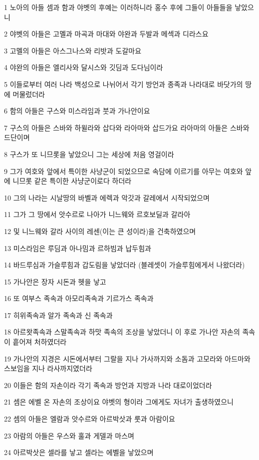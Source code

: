 \par 1 노아의 아들 셈과 함과 야벳의 후예는 이러하니라 홍수 후에 그들이 아들들을 낳았으니
\par 2 야벳의 아들은 고멜과 마곡과 마대와 야완과 두발과 메섹과 디라스요
\par 3 고멜의 아들은 아스그나스와 리밧과 도갈마요
\par 4 야완의 아들은 엘리사와 달시스와 깃딤과 도다님이라
\par 5 이들로부터 여러 나라 백성으로 나뉘어서 각기 방언과 종족과 나라대로 바닷가의 땅에 머물렀더라
\par 6 함의 아들은 구스와 미스라임과 붓과 가나안이요
\par 7 구스의 아들은 스바와 하윌라와 삽다와 라아마와 삽드가요 라아마의 아들은 스바와 드단이며
\par 8 구스가 또 니므롯을 낳았으니 그는 세상에 처음 영걸이라
\par 9 그가 여호와 앞에서 특이한 사냥군이 되었으므로 속담에 이르기를 아무는 여호와 앞에 니므롯 같은 특이한 사냥군이로다 하더라
\par 10 그의 나라는 시날땅의 바벨과 에렉과 악갓과 갈레에서 시작되었으며
\par 11 그가 그 땅에서 앗수르로 나아가 니느웨와 르호보딜과 갈라아
\par 12 및 니느웨와 갈라 사이의 레센(이는 큰 성이라)을 건축하였으며
\par 13 미스라임은 루딤과 아나밈과 르하빔과 납두힘과
\par 14 바드루심과 가슬루힘과 갑도림을 낳았더라 (블레셋이 가슬루힘에게서 나왔더라)
\par 15 가나안은 장자 시돈과 헷을 낳고
\par 16 또 여부스 족속과 아모리족속과 기르가스 족속과
\par 17 히위족속과 알가 족속과 신 족속과
\par 18 아르왓족속과 스말족속과 하맛 족속의 조상을 낳았더니 이 후로 가나안 자손의 족속이 흩어져 처하였더라
\par 19 가나안의 지경은 시돈에서부터 그랄을 지나 가사까지와 소돔과 고모라와 아드마와 스보임을 지나 라사까지였더라
\par 20 이들은 함의 자손이라 각기 족속과 방언과 지방과 나라 대로이었더라
\par 21 셈은 에벨 온 자손의 조상이요 야벳의 형이라 그에게도 자녀가 출생하였으니
\par 22 셈의 아들은 엘람과 앗수르와 아르박삿과 룻과 아람이요
\par 23 아람의 아들은 우스와 훌과 게델과 마스며
\par 24 아르박삿은 셀라를 낳고 셀라는 에벨을 낳았으며
